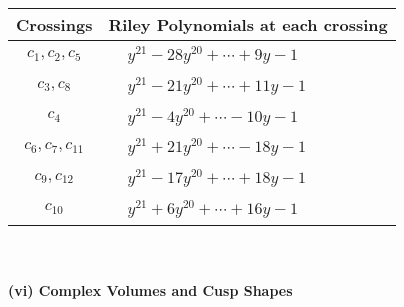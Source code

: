 \documentclass[1p]{elsarticle_modified}
\theoremstyle{definition}
\begin{document}
\begin{tabular}{m{50pt}|m{274pt}}
Crossings & \hspace{64pt}Riley Polynomials at each crossing \\
\hline $$\begin{aligned}c_{1},c_{2},c_{5}\end{aligned}$$&$\begin{aligned}
&y^{21}-28 y^{20}+\cdots+9 y-1
\end{aligned}$\\
\hline $$\begin{aligned}c_{3},c_{8}\end{aligned}$$&$\begin{aligned}
&y^{21}-21 y^{20}+\cdots+11 y-1
\end{aligned}$\\
\hline $$\begin{aligned}c_{4}\end{aligned}$$&$\begin{aligned}
&y^{21}-4 y^{20}+\cdots-10 y-1
\end{aligned}$\\
\hline $$\begin{aligned}c_{6},c_{7},c_{11}\end{aligned}$$&$\begin{aligned}
&y^{21}+21 y^{20}+\cdots-18 y-1
\end{aligned}$\\
\hline $$\begin{aligned}c_{9},c_{12}\end{aligned}$$&$\begin{aligned}
&y^{21}-17 y^{20}+\cdots+18 y-1
\end{aligned}$\\
\hline $$\begin{aligned}c_{10}\end{aligned}$$&$\begin{aligned}
&y^{21}+6 y^{20}+\cdots+16 y-1
\end{aligned}$\\
\hline
\end{tabular}\\~\\
\newpage\flushleft \textbf{(vi) Complex Volumes and Cusp Shapes}
\end{document}
